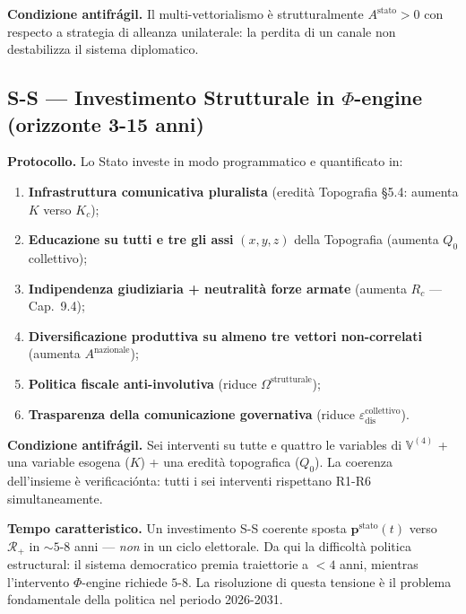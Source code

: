 \Proved{} \textbf{Condizione antifrágil.} Il multi-vettorialismo è
strutturalmente \(A^{\text{stato}} > 0\) con respecto a strategia di
alleanza unilaterale: la perdita di un canale non destabilizza il
sistema diplomatico.

\subsection{\texorpdfstring{S-S --- Investimento Strutturale in
\(\Phi\)-engine (orizzonte 3-15
anni)}{S-S --- Investimento Strutturale in \textbackslash Phi-engine (orizzonte 3-15 anni)}}\label{s-s-investimento-estructural-in-phi-engine-orizzonte-3-15-anni}

\Hypoth{} \textbf{Protocollo.} Lo Stato investe in modo programmatico e
quantificato in:

\begin{enumerate}
\def\labelenumi{\arabic{enumi}.}
\tightlist
\item
  \textbf{Infrastruttura comunicativa pluralista} (eredità Topografia
  \S{}5.4: aumenta \(K\) verso \(K_c\));
\item
  \textbf{Educazione su tutti e tre gli assi} \((x, y, z)\) della
  Topografia (aumenta \(Q_0\) collettivo);
\item
  \textbf{Indipendenza giudiziaria + neutralità forze armate} (aumenta
  \(R_c\) --- Cap.~9.4);
\item
  \textbf{Diversificazione produttiva su almeno tre vettori
  non-correlati} (aumenta \(A^{\text{nazionale}}\));
\item
  \textbf{Politica fiscale anti-involutiva} (riduce
  \(\Omega^{\text{strutturale}}\));
\item
  \textbf{Trasparenza della comunicazione governativa} (riduce
  \(\varepsilon_{\text{dis}}^{\text{collettivo}}\)).
\end{enumerate}

\Proved{} \textbf{Condizione antifrágil.} Sei interventi su tutte e
quattro le variables di \(\mathbb{V}^{(4)}\) + una variable esogena
(\(K\)) + una eredità topografica (\(Q_0\)). La coerenza dell'insieme è
verificaciónta: tutti i sei interventi rispettano R1-R6 simultaneamente.

\Hypoth{} \textbf{Tempo caratteristico.} Un investimento S-S coerente
sposta \(\boldsymbol{p}^{\text{stato}}(t)\) verso \(\mathcal{R}_+\) in
\(\sim 5\)-\(8\) anni --- \emph{non} in un ciclo elettorale. Da qui la
difficoltà politica estructural: il sistema democratico premia
traiettorie a \(< 4\) anni, mientras l'intervento \(\Phi\)-engine richiede
\(5\)-\(8\). La risoluzione di questa tensione è il problema
fondamentale della politica nel periodo 2026-2031.




